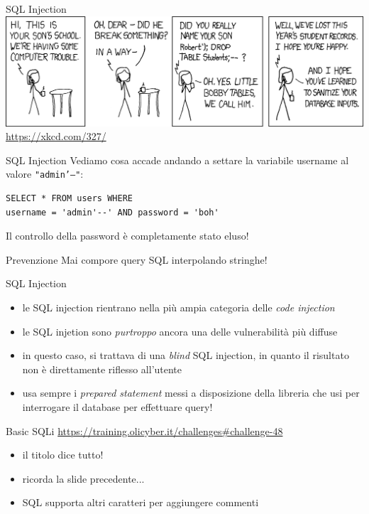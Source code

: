 \documentclass[12pt]{beamer}
\begin{document}
\begin{frame}{SQL Injection}
    \includegraphics[width=\textwidth]{img/sqli.png}
    \url{https://xkcd.com/327/}
\end{frame}
    
\begin{frame}[fragile]{SQL Injection}
Vediamo cosa accade andando a settare la variabile username al valore \texttt{"admin'--"}:
\vfill
\begin{verbatim}
SELECT * FROM users WHERE 
username = 'admin'--' AND password = 'boh'
\end{verbatim}
\pause
\vfill
Il controllo della password è completamente stato eluso!
\vfill
\begin{alertblock}{Prevenzione}
Mai compore query SQL interpolando stringhe!
\end{alertblock}

\end{frame}

\begin{frame}{SQL Injection}
\begin{itemize}
\item le SQL injection rientrano nella più ampia categoria delle \textit{code injection}
\item le SQL injetion sono \textit{purtroppo} ancora una delle vulnerabilità più diffuse
\item in questo caso, si trattava di una \textit{blind} SQL injection, in quanto il risultato non è direttamente riflesso all'utente
\item usa sempre i \textit{prepared statement} messi a disposizione della libreria che usi per interrogare il database per effettuare query!
\end{itemize}
\end{frame}

\begin{frame}{Basic SQLi}
\url{https://training.olicyber.it/challenges\#challenge-48}
\vfill
\begin{itemize}
    \item il titolo dice tutto!
    \pause
    \item ricorda la slide precedente... 
    \pause
    \item SQL supporta altri caratteri per aggiungere commenti
\end{itemize}

\end{frame}
\end{document}
